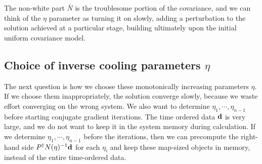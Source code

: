 \documentclass[twocolumn,linenumbers]{aastex631}
\newcommand{\vbd}{\vb{d}}
\newcommand{\inv}[1]{#1^{-1}}
\newcommand{\hatm}{\vb{\hat{m}}}
\newcommand{\Pdagger}{P^{\dagger}}
\newcommand{\Nbar}{\bar{N}}
\begin{document}

The non-white part $\bar N$ is the troublesome portion of the covariance, and 
we can think of the $\eta$ parameter as turning it on slowly, adding a perturbation to the solution achieved at a particular stage, building ultimately upon the initial uniform covariance model.




\subsection{Choice of inverse cooling parameters $\eta$}
The next question is how we choose these monotonically increasing parameters
$\eta$. 
If we choose them inappropriately,  the solution converge
slowly, because we waste effort converging on the wrong system.
We also want to determine $\eta_1, \cdots, \eta_{n-1}$ before starting conjugate
gradient iterations.  The time ordered data $\vbd$ is very large,
and we do not want to keep it in the system memory during calculation.  If we determine $\eta_1, \cdots, \eta_{n-1}$ before the iterations, 
then we can precompute the right-hand side $\Pdagger \inv{N(\eta)} \vbd$ for each $\eta_i$ and keep these map-sized objects in memory, instead of the entire time-ordered data.
\end{document}
